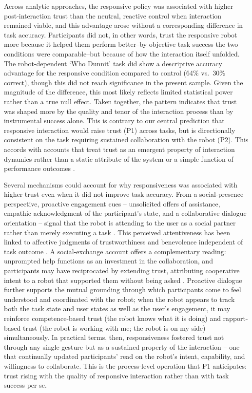 \documentclass[
  authoryear,
  doubleblind,
  3p]{elsarticle}
\begin{document}
Across analytic approaches, the responsive policy was associated with
higher post-interaction trust than the neutral, reactive control when
interaction remained viable, and this advantage arose without a
corresponding difference in task accuracy. Participants did not, in
other words, trust the responsive robot more because it helped them
perform better--by objective task success the two conditions were
comparable--but because of how the interaction itself unfolded. The
robot-dependent `Who Dunnit' task did show a descriptive accuracy
advantage for the responsive condition compared to control (64\%
vs.~30\% correct), though this did not reach significance in the present
sample. Given the magnitude of the difference, this most likely reflects
limited statistical power rather than a true null effect. Taken
together, the pattern indicates that trust was shaped more by the
quality and tenor of the interaction process than by instrumental
success alone. This is contrary to our central prediction that
responsive interaction would raise trust (P1) across tasks, but is
directionally consistent on the task requiring sustained collaboration
with the robot (P2). This accords with accounts that treat trust as an
emergent property of interaction dynamics rather than a static attribute
of the system or a simple function of performance outcomes
\citep{lee2004, devisser2020}.

Several mechanisms could account for why responsiveness was associated
with higher trust even when it did not improve task accuracy. From a
social-presence perspective, proactive engagement cues -- unsolicited
offers of assistance, empathic acknowledgment of the participant's
state, and a collaborative dialogue orientation -- signal that the robot
is attending to the user as a social partner rather than merely
executing a task \citep{birnbaum2016, shayganfar2019}. This perceived
attentiveness has been linked to affective judgments of trustworthiness
and benevolence independent of task outcome \citep{birnbaum2016}. A
social-exchange account offers a complementary reading: unprompted help
functions as an investment in the collaboration, and participants may
have reciprocated by extending trust, attributing cooperative intent to
a robot that supported them without being asked \citep{fartook2025}.
Proactive dialogue further supports the mutual grounding through which
participants come to feel understood and coordinated with the robot;
when the robot appears to track both the task state and user states as
well as the user's engagement, it may reinforce competence-based trust
(the robot knows what it is doing) and rapport-based trust (the robot is
working with me; the robot is on my side) simultaneously. In practical
terms, then, responsiveness fostered trust not through any single
gesture but as a sustained property of the interaction -- one that
continually updated participants' read on the robot's intent,
capability, and willingness to collaborate. This is the process-level
operation that P1 anticipates: trust rising with the quality of
responsive interaction rather than with task success per se.
\end{document}
